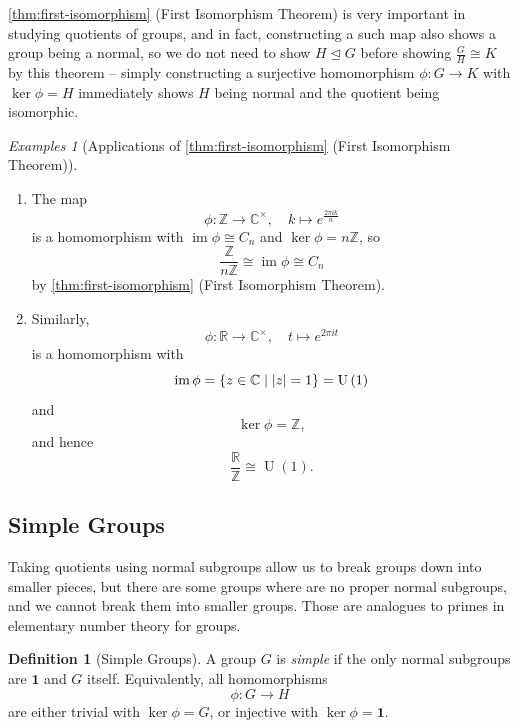 \documentclass{article}
\theoremstyle{definition}
\newtheorem{definition}[theorem]{Definition}
\theoremstyle{remark}
\DeclarePairedDelimiter{\abs}{\lvert}{\rvert}
\newcommand{\pqty}[1]{\left(#1\right)}
\newcommand{\set}[2]{\{#1\mid #2\}}
\newcommand{\flatfrac}[2]{\frac{#1}{#2}}
\newcommand{\functiondomain}[3]{#1:#2\to #3}
\newcommand{\function}[5]{#1:#2\to #3,\quad #4\mapsto #5}
\newcommand{\multiplicative}{^{\times}}
\newcommand{\isomorphic}{\cong}
\newcommand{\normalsub}{\trianglelefteq}
\newcommand{\ZZ}{\mathbb{Z}}
\newcommand{\RR}{\mathbb{R}}
\newcommand{\CC}{\mathbb{C}}
\newcommand{\img}{\operatorname{im}}
\newtheorem*{examples*}{Examples}
\newcommand{\trivialgp}{\mathbf{1}}
\newcommand{\U}{\operatorname{U}}
\begin{document}
\autoref{thm:first-isomorphism} (First Isomorphism Theorem) is very important in studying quotients of groups, and in fact, constructing a such map also shows a group being a normal, so we do not need to show \(H \normalsub G\) before showing \(\flatfrac{G}{H} \isomorphic K\) by this theorem -- simply constructing a surjective homomorphism \(\functiondomain{\phi}{G}{K}\) with \(\ker \phi = H\) immediately shows \(H\) being normal and the quotient being isomorphic.

\begin{examples*}[Applications of \autoref{thm:first-isomorphism} (First Isomorphism Theorem)]
    \begin{enumerate}
        \item The map
        \[
            \function{\phi}{\ZZ}{\CC\multiplicative}{k}{e^{\frac{2\pi i k}{n}}}
        \]
        is a homomorphism with \(\img \phi \isomorphic C_n\) and \(\ker \phi = n\ZZ\), so
        \[
            \flatfrac{\ZZ}{n\ZZ} \isomorphic \img \phi \isomorphic C_n
        \]
        by \autoref{thm:first-isomorphism} (First Isomorphism Theorem).

        \item Similarly,
        \[
            \function{\phi}{\RR}{\CC\multiplicative}{t}{e^{2 \pi i t}}
        \]
        is a homomorphism with
        \[
            \img \phi = \set{z \in \CC}{\abs{z} = 1} = \U\pqty{1}
        \]
        and
        \[
            \ker \phi = \ZZ,
        \]
        and hence
        \[
            \flatfrac{\RR}{\ZZ} \isomorphic \U\pqty{1}.
        \]
    \end{enumerate}
\end{examples*}

\subsection{Simple Groups}
\label{sec:simple-groups}

Taking quotients using normal subgroups allow us to break groups down into smaller pieces, but there are some groups where are no proper normal subgroups, and we cannot break them into smaller groups. Those are analogues to primes in elementary number theory for groups.

\begin{definition}[Simple Groups]
    A group \(G\) is \emph{simple} if the only normal subgroups are \(\trivialgp\) and \(G\) itself. Equivalently, all homomorphisms
    \[
        \functiondomain{\phi}{G}{H}
    \]
    are either trivial with \(\ker \phi = G\), or injective with \(\ker \phi = \trivialgp\).
\end{definition}
\end{document}
